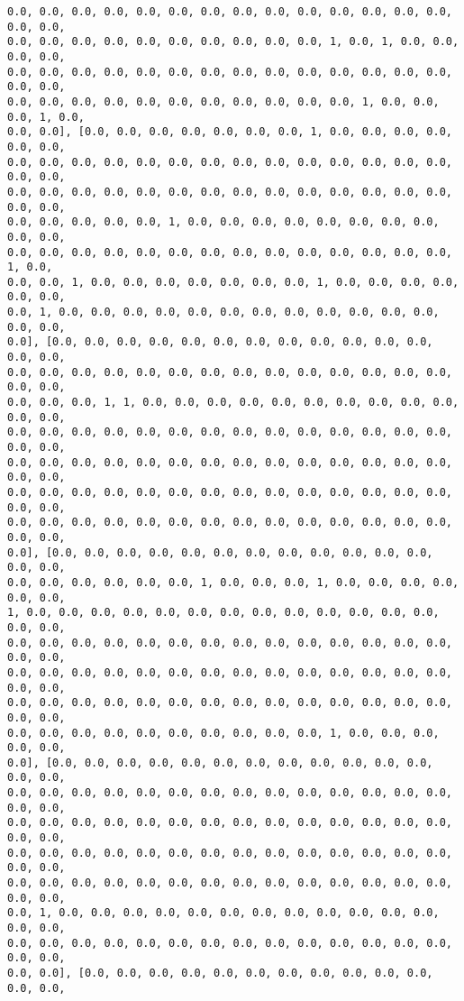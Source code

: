 \documentclass[11pt]{article}
\begin{document}
\begin{Verbatim}[commandchars=\\\{\}]
0.0, 0.0, 0.0, 0.0, 0.0, 0.0, 0.0, 0.0, 0.0, 0.0, 0.0, 0.0, 0.0, 0.0, 0.0, 0.0,
0.0, 0.0, 0.0, 0.0, 0.0, 0.0, 0.0, 0.0, 0.0, 0.0, 1, 0.0, 1, 0.0, 0.0, 0.0, 0.0,
0.0, 0.0, 0.0, 0.0, 0.0, 0.0, 0.0, 0.0, 0.0, 0.0, 0.0, 0.0, 0.0, 0.0, 0.0, 0.0,
0.0, 0.0, 0.0, 0.0, 0.0, 0.0, 0.0, 0.0, 0.0, 0.0, 0.0, 1, 0.0, 0.0, 0.0, 1, 0.0,
0.0, 0.0], [0.0, 0.0, 0.0, 0.0, 0.0, 0.0, 0.0, 1, 0.0, 0.0, 0.0, 0.0, 0.0, 0.0,
0.0, 0.0, 0.0, 0.0, 0.0, 0.0, 0.0, 0.0, 0.0, 0.0, 0.0, 0.0, 0.0, 0.0, 0.0, 0.0,
0.0, 0.0, 0.0, 0.0, 0.0, 0.0, 0.0, 0.0, 0.0, 0.0, 0.0, 0.0, 0.0, 0.0, 0.0, 0.0,
0.0, 0.0, 0.0, 0.0, 0.0, 1, 0.0, 0.0, 0.0, 0.0, 0.0, 0.0, 0.0, 0.0, 0.0, 0.0,
0.0, 0.0, 0.0, 0.0, 0.0, 0.0, 0.0, 0.0, 0.0, 0.0, 0.0, 0.0, 0.0, 0.0, 1, 0.0,
0.0, 0.0, 1, 0.0, 0.0, 0.0, 0.0, 0.0, 0.0, 0.0, 1, 0.0, 0.0, 0.0, 0.0, 0.0, 0.0,
0.0, 1, 0.0, 0.0, 0.0, 0.0, 0.0, 0.0, 0.0, 0.0, 0.0, 0.0, 0.0, 0.0, 0.0, 0.0,
0.0], [0.0, 0.0, 0.0, 0.0, 0.0, 0.0, 0.0, 0.0, 0.0, 0.0, 0.0, 0.0, 0.0, 0.0,
0.0, 0.0, 0.0, 0.0, 0.0, 0.0, 0.0, 0.0, 0.0, 0.0, 0.0, 0.0, 0.0, 0.0, 0.0, 0.0,
0.0, 0.0, 0.0, 1, 1, 0.0, 0.0, 0.0, 0.0, 0.0, 0.0, 0.0, 0.0, 0.0, 0.0, 0.0, 0.0,
0.0, 0.0, 0.0, 0.0, 0.0, 0.0, 0.0, 0.0, 0.0, 0.0, 0.0, 0.0, 0.0, 0.0, 0.0, 0.0,
0.0, 0.0, 0.0, 0.0, 0.0, 0.0, 0.0, 0.0, 0.0, 0.0, 0.0, 0.0, 0.0, 0.0, 0.0, 0.0,
0.0, 0.0, 0.0, 0.0, 0.0, 0.0, 0.0, 0.0, 0.0, 0.0, 0.0, 0.0, 0.0, 0.0, 0.0, 0.0,
0.0, 0.0, 0.0, 0.0, 0.0, 0.0, 0.0, 0.0, 0.0, 0.0, 0.0, 0.0, 0.0, 0.0, 0.0, 0.0,
0.0], [0.0, 0.0, 0.0, 0.0, 0.0, 0.0, 0.0, 0.0, 0.0, 0.0, 0.0, 0.0, 0.0, 0.0,
0.0, 0.0, 0.0, 0.0, 0.0, 0.0, 1, 0.0, 0.0, 0.0, 1, 0.0, 0.0, 0.0, 0.0, 0.0, 0.0,
1, 0.0, 0.0, 0.0, 0.0, 0.0, 0.0, 0.0, 0.0, 0.0, 0.0, 0.0, 0.0, 0.0, 0.0, 0.0,
0.0, 0.0, 0.0, 0.0, 0.0, 0.0, 0.0, 0.0, 0.0, 0.0, 0.0, 0.0, 0.0, 0.0, 0.0, 0.0,
0.0, 0.0, 0.0, 0.0, 0.0, 0.0, 0.0, 0.0, 0.0, 0.0, 0.0, 0.0, 0.0, 0.0, 0.0, 0.0,
0.0, 0.0, 0.0, 0.0, 0.0, 0.0, 0.0, 0.0, 0.0, 0.0, 0.0, 0.0, 0.0, 0.0, 0.0, 0.0,
0.0, 0.0, 0.0, 0.0, 0.0, 0.0, 0.0, 0.0, 0.0, 0.0, 1, 0.0, 0.0, 0.0, 0.0, 0.0,
0.0], [0.0, 0.0, 0.0, 0.0, 0.0, 0.0, 0.0, 0.0, 0.0, 0.0, 0.0, 0.0, 0.0, 0.0,
0.0, 0.0, 0.0, 0.0, 0.0, 0.0, 0.0, 0.0, 0.0, 0.0, 0.0, 0.0, 0.0, 0.0, 0.0, 0.0,
0.0, 0.0, 0.0, 0.0, 0.0, 0.0, 0.0, 0.0, 0.0, 0.0, 0.0, 0.0, 0.0, 0.0, 0.0, 0.0,
0.0, 0.0, 0.0, 0.0, 0.0, 0.0, 0.0, 0.0, 0.0, 0.0, 0.0, 0.0, 0.0, 0.0, 0.0, 0.0,
0.0, 0.0, 0.0, 0.0, 0.0, 0.0, 0.0, 0.0, 0.0, 0.0, 0.0, 0.0, 0.0, 0.0, 0.0, 0.0,
0.0, 1, 0.0, 0.0, 0.0, 0.0, 0.0, 0.0, 0.0, 0.0, 0.0, 0.0, 0.0, 0.0, 0.0, 0.0,
0.0, 0.0, 0.0, 0.0, 0.0, 0.0, 0.0, 0.0, 0.0, 0.0, 0.0, 0.0, 0.0, 0.0, 0.0, 0.0,
0.0, 0.0], [0.0, 0.0, 0.0, 0.0, 0.0, 0.0, 0.0, 0.0, 0.0, 0.0, 0.0, 0.0, 0.0,

\end{Verbatim}
\end{document}
